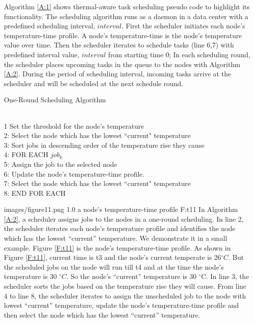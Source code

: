 Algorithm \ref{A:1} shows thermal-aware task scheduling pseudo code to highlight its functionality. The scheduling algorithm runs as a daemon in a data center with a predefined scheduling interval, $interval$. First the scheduler initiates each node's temperature-time profile. A node's temperature-time is the node's temperature value over time. Then the scheduler iterates to schedule tasks (line 6,7) with predefined interval value, $interval$ from starting time 0; In each scheduling round, the scheduler places upcoming tasks in the queue to the nodes with Algorithm \ref{A:2}. During the period of scheduling interval, incoming tasks arrive at the scheduler and will be scheduled at the next schedule round. 

\begin{algorithm}
\caption{One-Round Scheduling Algorithm }
\label{A:2}
~\\
1        Set the threshold for the node's temperature\\
2:       Select the node which has the lowest ``current" temperature\\
3:       Sort jobs in descending order of the temperature rise they cause\\
4:       FOR EACH $job_k$\\
5: \BH          Assign the job to the selected node\\
6: \BH          Update the node's temperature-time profile.\\
7: \BH	 			Select the node which has the lowest ``current" temperature\\
8:     END FOR EACH\\          
\end{algorithm}

 {images/figure11.png}
  {1.0}
 {a node's temperature-time profile}
 {F:t11}
In Algorithm \ref{A:2}, a scheduler assigns jobs to the nodes in a one-round scheduling. In line 2, the scheduler iterates each node's temperature profile and identifies the node which has the lowest ``current'' temperature. We demonstrate it in a small example. Figure \ref{F:t11} is the node's temperature-time profile. As shown in Figure \ref{F:t11}, current time is t3 and the node's current temperate is 26$^\circ C$.  But the scheduled jobs on the node will run till t4 and at the time the node's temperature is 30 $^\circ C$. So the node's ``current'' temperature is 30 $^\circ$C. In line 3, the scheduler sorts the jobs based on the temperature rise they will cause. From line 4 to line 8, the scheduler iterates to assign the unscheduled job to the node with lowest ``current'' temperature, update the node's temperature-time profile and then select the node which has the lowest ``current'' temperature. 


